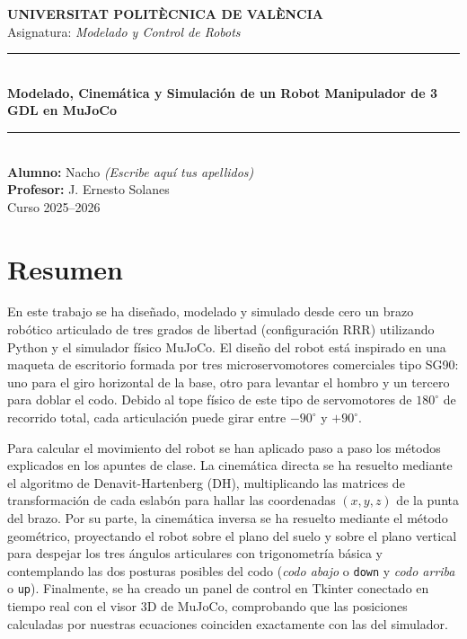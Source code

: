 \documentclass[11pt,a4paper]{article}
\begin{document}
\begin{titlepage}
    \centering
    \vspace*{2cm}
    {\Large \textbf{UNIVERSITAT POLITÈCNICA DE VALÈNCIA}}\\[0.4cm]
    {\large Asignatura: \textit{Modelado y Control de Robots}}\\[2.5cm]

    \rule{\linewidth}{0.5mm}\\[0.4cm]
    {\LARGE \bfseries Modelado, Cinemática y Simulación de un Robot Manipulador de 3 GDL en MuJoCo}\\[0.2cm]
    \rule{\linewidth}{0.5mm}\\[2cm]

    {\large \textbf{Alumno:} Nacho \textit{(Escribe aquí tus apellidos)}}\\[0.4cm]
    {\large \textbf{Profesor:} J. Ernesto Solanes}\\[3cm]

    \vfill
    {\normalsize Curso 2025--2026}
\end{titlepage}

\section*{Resumen}

En este trabajo se ha diseñado, modelado y simulado desde cero un brazo robótico articulado de tres grados de libertad (configuración RRR) utilizando Python y el simulador físico MuJoCo. El diseño del robot está inspirado en una maqueta de escritorio formada por tres microservomotores comerciales tipo SG90: uno para el giro horizontal de la base, otro para levantar el hombro y un tercero para doblar el codo. Debido al tope físico de este tipo de servomotores de $180^\circ$ de recorrido total, cada articulación puede girar entre $-90^\circ$ y $+90^\circ$.

Para calcular el movimiento del robot se han aplicado paso a paso los métodos explicados en los apuntes de clase. La cinemática directa se ha resuelto mediante el algoritmo de Denavit-Hartenberg (DH), multiplicando las matrices de transformación de cada eslabón para hallar las coordenadas $(x, y, z)$ de la punta del brazo. Por su parte, la cinemática inversa se ha resuelto mediante el método geométrico, proyectando el robot sobre el plano del suelo y sobre el plano vertical para despejar los tres ángulos articulares con trigonometría básica y contemplando las dos posturas posibles del codo (\textit{codo abajo} o \texttt{down} y \textit{codo arriba} o \texttt{up}). Finalmente, se ha creado un panel de control en Tkinter conectado en tiempo real con el visor 3D de MuJoCo, comprobando que las posiciones calculadas por nuestras ecuaciones coinciden exactamente con las del simulador.
\end{document}
